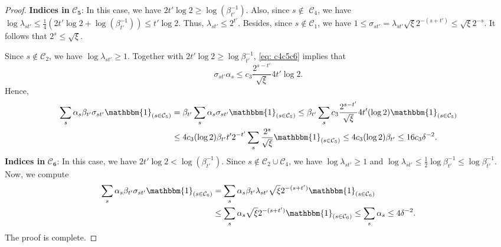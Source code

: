 \documentclass{article}
\theoremstyle{plain}
\theoremstyle{definition}
\theoremstyle{remark}
\newcommand{\CCal}{\mathcal{C}}
\begin{document}
\begin{appendix}
\begin{center}
\begin{proof}
			\textbf{Indices in} $\mathbf{\CCal_5}$:
			In this case, we have $2 t' \log 2 \geq \log (\beta_{t'}^{-1})$. Also, since $s \notin$ $\mathcal{C}_4$, we have $\log \lambda_{s t'} \leq \frac{1}{4}\left(2 t' \log 2+\log (\beta_{t'}^{-1}) \right) \leq t' \log 2$. Thus, $\lambda_{s t'} \leq 2^{t'}$. Besides, since $s \notin \mathcal{C}_1$, we have $1 \leq \sigma_{s t'}=\lambda_{s t'} \sqrt{\xi} 2^{-(s+t')} \leq \sqrt{\xi} 2^{-s}$. It follows that $2^s \leq \sqrt{\xi}$.
			
			Since $s\notin \mathcal{C}_2$, we have $\log \lambda_{s t'} \geq 1$. Together with $2 t' \log 2 \geq \log \beta_{t'}^{-1}$, \eqref{eq: c4c5c6} implies that
			\[
			\sigma_{s t'} \alpha_s \leq c_3 \frac{2^{s-t'}}{\sqrt{\xi}} 4 t' \log 2.
			\]
			Hence,
			\begin{align*}
				\sum_{s} \alpha_s \beta_{t'} \sigma_{s t'} \mathbbm{1}_{\left(s \in \mathcal{C}_5\right)} &=\beta_{t'} \sum_s \alpha_s \sigma_{s t'} \mathbbm{1}_{\left(s \in \mathcal{C}_5\right)} \leq \beta_{t'} \sum_s c_3 \frac{2^{s-t'}}{\sqrt{\xi}} 4 t'(\log 2) \mathbbm{1}_{\left(s \in \mathcal{C}_5\right)} \\
				& \leq 4 c_3 (\log 2) \beta_{t'} t' 2^{-t'} \sum_s  \frac{2^s}{\sqrt{\xi}} \mathbbm{1}_{\left(s \in \mathcal{C}_5\right)} \leq 4 c_3 (\log 2) \beta_{t'} \leq 16 c_3 \delta^{-2}.
			\end{align*}
			\textbf{Indices in} $\mathbf{\CCal_6}$: In this case, we have $2 t' \log 2<\log (\beta_{t'}^{-1})$. Since $s \notin \mathcal{C}_2 \cup \CCal_4$, we have $\log \lambda_{s t'} \geq 1$ and $\log \lambda_{s t'} \leq \frac{1}{2} \log \beta_{t'}^{-1} \leq \log \beta_{t'}^{-1}$. Now, we compute
			\begin{align*}
				\sum_{s} \alpha_s \beta_{t'} \sigma_{s t'} \mathbbm{1}_{\left(s \in \mathcal{C}_6\right)} &=\sum_s \alpha_s  \beta_{t'} \lambda_{s t'} \sqrt{\xi} 2^{-(s+t')} \mathbbm{1}_{\left(s \in \mathcal{C}_6\right)} \\
				& \leq \sum_s \alpha_s \sqrt{\xi} 2^{-(s+t')} \mathbbm{1}_{\left(s \in \mathcal{C}_6\right)} \leq \sum_s \alpha_s \leq 4 \delta^{-2}.
			\end{align*}
			The proof is complete.
		\end{proof}


\end{center}
\end{appendix}
\end{document}
